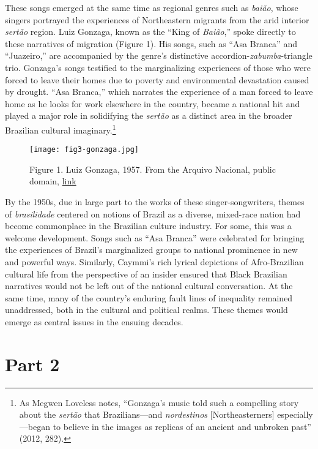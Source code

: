 \documentclass[twoside]{article}
\begin{document}
These songs emerged at the same time as regional genres such as
\emph{baião}, whose singers portrayed the experiences of Northeastern
migrants from the arid interior \emph{sertão} region. Luiz Gonzaga,
known as the ``King of \emph{Baião},'' spoke directly to these
narratives of migration (Figure 1). His songs, such as ``Asa Branca''
and ``Juazeiro,'' are accompanied by the genre's distinctive
accordion-\emph{zabumba}-triangle trio. Gonzaga's songs testified to the
marginalizing experiences of those who were forced to leave their homes
due to poverty and environmental devastation caused by drought. ``Asa
Branca,'' which narrates the experience of a man forced to leave home as
he looks for work elsewhere in the country, became a national hit and
played a major role in solidifying the \emph{sertão} as a distinct area
in the broader Brazilian cultural imaginary.\footnote{As Megwen Loveless
  notes, ``Gonzaga's music told such a compelling story about the
  \emph{sertão} that Brazilians---and \emph{nordestinos}
  {[}Northeasterners{]} especially---began to believe in the images as
  replicas of an ancient and unbroken past'' (2012, 282).}

\begin{figure}
  \texttt{[image: fig3-gonzaga.jpg]}
  \caption{Figure 1. Luiz Gonzaga, 1957. From the Arquivo Nacional, public domain, \href{https://en.wikipedia.org/wiki/Luiz_Gonzaga\#/media/File:Luiz_Gonzaga_(1957).tif}{link}}
\end{figure}

By the 1950s, due in large part to the works of these
singer-songwriters, themes of \emph{brasilidade} centered on notions of
Brazil as a diverse, mixed-race nation had become commonplace in the
Brazilian culture industry. For some, this was a welcome development.
Songs such as ``Asa Branca'' were celebrated for bringing the
experiences of Brazil's marginalized groups to national prominence in
new and powerful ways. Similarly, Caymmi's rich lyrical depictions of
Afro-Brazilian cultural life from the perspective of an insider ensured
that Black Brazilian narratives would not be left out of the national
cultural conversation. At the same time, many of the country's enduring
fault lines of inequality remained unaddressed, both in the cultural and
political realms. These themes would emerge as central issues in the
ensuing decades.

\section*{Part 2}
\end{document}
